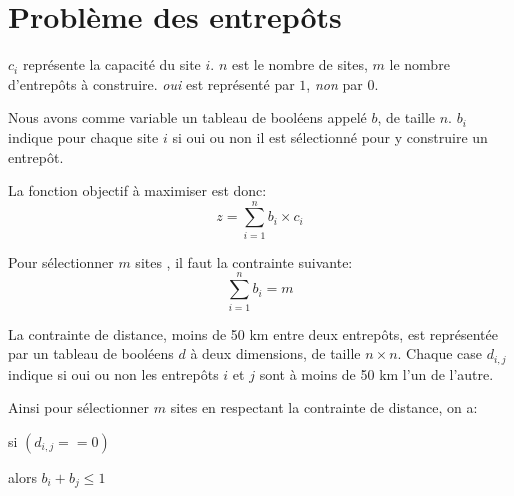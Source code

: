 \documentclass[11pt]{article}
\begin{document}
\section{Probl\`eme des entrep\^ots}
$c_i$ repr\'esente la capacit\'e du site $i$. $n$ est le nombre de sites, $m$ le nombre d'entrep\^ots \`a construire. \emph{oui} est repr\'esent\'e par $1$, \emph{non} par $0$.

Nous avons comme variable un tableau de bool\'eens appel\'e $b$, de taille $n$. $b_i$ indique pour chaque site $i$ si oui ou non il est s\'electionn\'e pour y construire un entrep\^ot.

La fonction objectif \`a maximiser est donc: \[z=\sum_{i=1}^{n}b_i\times{}c_i\]

Pour s\'electionner $m$ sites , il faut la contrainte suivante: \[\sum_{i=1}^{n}b_i=m\]

La contrainte de distance, moins de 50 km entre deux entrep\^ots, est repr\'esent\'ee par un tableau de bool\'eens $d$ \`a deux dimensions, de taille $n\times{}n$. Chaque case $d_{i,j}$ indique si oui ou non les entrep\^ots $i$ et $j$ sont \`a moins de 50 km l'un de l'autre.

Ainsi pour s\'electionner $m$ sites en respectant la contrainte de distance, on a:

si $(d_{i,j} == 0)$

alors $b_{i}+b_{j} \leq 1$

\end{document}
